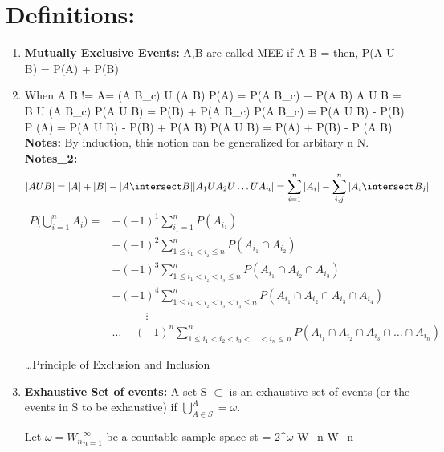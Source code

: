 \documentclass{article}
\begin{document}
\section{Definitions:}
\begin{enumerate}
    \item \textbf{Mutually Exclusive Events:} A,B \in \epsilon are called MEE if A \intersect B = \phi
    then, P(A U B) = P(A) + P(B)

    \item When A \intersect B != \phi 
    A= (A \intersect B_c) U (A \intersect B)
    P(A) = P(A \intersect B_c) + P(A \intersect B)
    A U B = B U (A \intersect B_c)
    P(A U B) = P(B) + P(A \intersect B_c)
    P(A \intersect B_c) = P(A U B) - P(B)
    P (A) = P(A U B) - P(B) + P(A \intersect B)
    P(A U B) = P(A) + P(B) - P (A \intersect B)\\

    \textbf{Notes:} By induction, this notion can be generalized for arbitary n \in N.
    \textbf{Notes_2:} 
    \begin{equation}
        |A U B| = |A| + |B| - |A \intersect B|
        | A_1 U A_2 U \dots U A_n| = \sum_{i=1}^{n}|A_i| - \sum_{i,j}^{n}|A_i \intersect B_j|
    \end{equation}
    \begin{align}
P\Big( \bigcup_{i=1}^{n}A_i\Big)
=&-(-1)^1\sum_{i{_1}=1}^{n}P(A_{i_1})
\\
&-(-1)^2\sum_{1\leq i{_1}<i_{_2}\leq n}^{n}P(A_{i_1}\cap A_{i_2})
\\
&-(-1)^3\sum_{1\leq i{_1}<i_{_2}<i_{_3}\leq n}^{n}P(A_{i_1}\cap A_{i_2}\cap A_{i_3})
\\
&-(-1)^4\sum_{1\leq i{_1}<i_{_2}<i_{_3}<i_{_4}\leq n}^{n}P(A_{i_1}\cap A_{i_2}\cap A_{i_3}\cap A_{i_4})
\\
&\quad\quad\quad\vdots
\\
&\ldots-(-1)^n \sum_{1\leq i_{1}<i_{2}<i_{3}<\ldots <i_{n}\leq n}^{n}P(A_{i_1}\cap A_{i_2}\cap A_{i_3}\cap \ldots \cap A_{i_n})
\end{align}

\dots Principle of Exclusion and Inclusion

    \item \textbf{Exhaustive Set of events:} A set S $\subset$ \epsilon is an exhaustive set of events (or the events in S to be exhaustive) if $\bigcup\limits_{A \in S}^ A = \omega$.

    Let $\omega = {W_n}_{n=1}^{\infty} $ be a countable sample space st \epsilon = 2^{$\omega$} 
    {W_n} \in \epsilon \forall W_n \in \omega


\end{enumerate}
\end{document}
